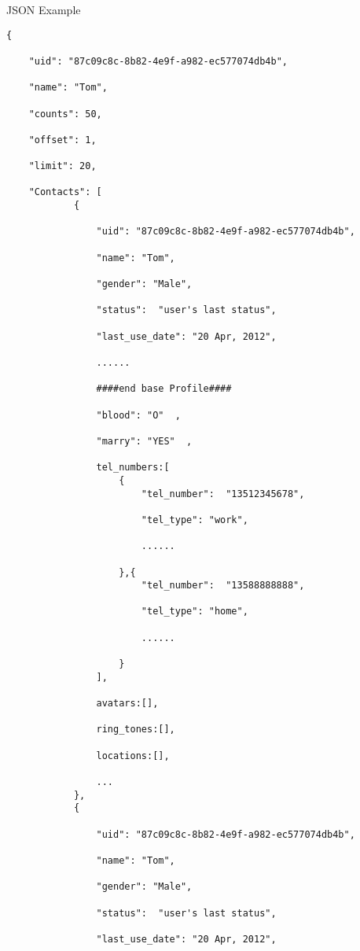 JSON Example

\begin{verbatim}
{

    "uid": "87c09c8c-8b82-4e9f-a982-ec577074db4b",

    "name": "Tom",

    "counts": 50,  

    "offset": 1,  

    "limit": 20,

    "Contacts": [
            {

                "uid": "87c09c8c-8b82-4e9f-a982-ec577074db4b",

                "name": "Tom",

                "gender": "Male",

                "status":  "user's last status",

                "last_use_date": "20 Apr, 2012",

                ......

                ####end base Profile####

                "blood": "O"  ,

                "marry": "YES"  ,

                tel_numbers:[
                    {
                        "tel_number":  "13512345678",

                        "tel_type": "work",

                        ......

                    },{
                        "tel_number":  "13588888888",

                        "tel_type": "home",

                        ......

                    }
                ],

                avatars:[],

                ring_tones:[],

                locations:[],

                ...
            },
            {

                "uid": "87c09c8c-8b82-4e9f-a982-ec577074db4b",

                "name": "Tom",

                "gender": "Male",

                "status":  "user's last status",

                "last_use_date": "20 Apr, 2012",


\end{verbatim}

